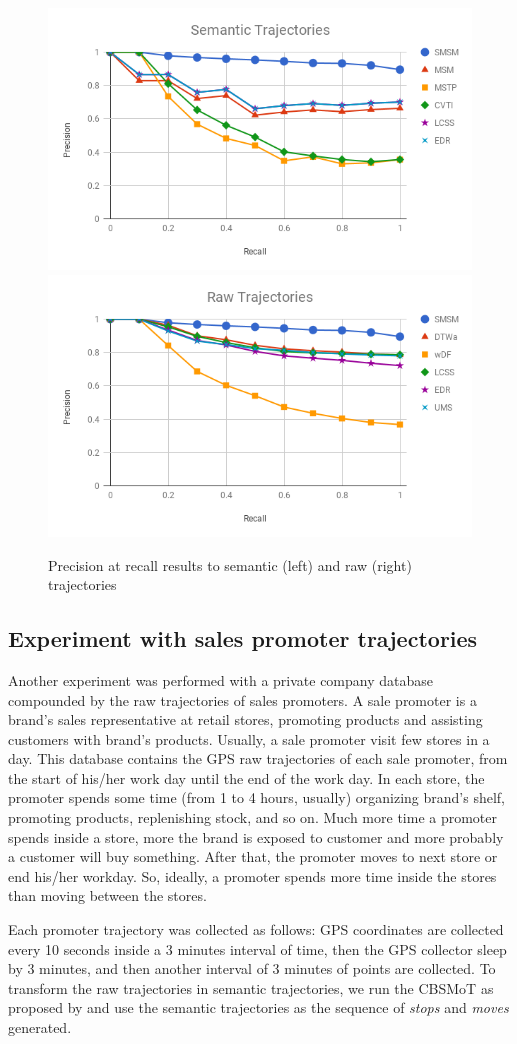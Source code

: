 \documentclass[12pt]{article}
\begin{document}
\begin{figure}[ht!]
\centerline{
\centering
\includegraphics[width=.55\textwidth]{Images/P_R-chart_Geolife.png}
\includegraphics[width=.55\textwidth]{Images/P_R-chart_Geolife-raw.png}
}
\caption{Precision at recall results to semantic (left) and raw (right) trajectories}
\label{fig:geolife_precision_recall}
\end{figure}

\subsection{Experiment with sales promoter trajectories}
Another experiment was performed with a private company database compounded by the raw trajectories of sales promoters. A sale promoter is a brand's sales representative at retail stores, promoting products and assisting customers with brand's products. Usually, a sale promoter visit few stores in a day. This database contains the GPS raw trajectories of each sale promoter, from the start of his/her work day until the end of the work day.
In each store, the promoter spends some time (from 1 to 4 hours, usually) organizing brand's shelf, promoting products, replenishing stock, and so on. Much more time a promoter spends inside a store, more the brand is exposed to customer and more probably a customer will buy something. After that, the promoter moves to next store or end his/her workday. So, ideally, a promoter spends more time inside the stores than moving between the stores.

Each promoter trajectory was collected as follows: GPS coordinates are collected  every 10 seconds inside a 3 minutes interval of time, then the GPS collector sleep by 3 minutes, and then another interval of 3 minutes of points are collected.
To transform the raw trajectories in semantic trajectories, we run the CBSMoT as proposed by \cite{furtado:2017:cbsmot-like} and use the semantic trajectories as the sequence of \emph{stops} and \emph{moves} generated.
\end{document}
